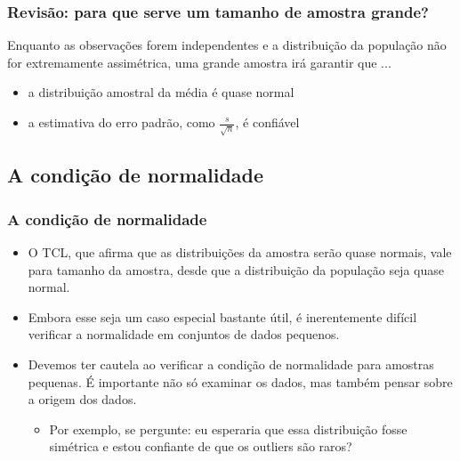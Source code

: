 \begin{frame}
\frametitle{Revisão: para que serve um tamanho de amostra grande?}
\justifying
Enquanto as observações forem independentes e a distribuição da população não for extremamente assimétrica, uma grande amostra irá garantir que ...

\begin{itemize}
\justifying
\item a distribuição amostral da média é quase normal
\justifying
\item a estimativa do erro padrão, como $\frac{s}{\sqrt{n}}$, é confiável

\end{itemize}

\end{frame}


\subsection{A condição de normalidade}


\begin{frame}
\frametitle{A condição de normalidade}

\begin{itemize}
\justifying
\item O TCL, que afirma que as distribuições da amostra serão quase normais, vale para  tamanho da amostra, desde que a distribuição da população seja quase normal.

\pause
\justifying
\item Embora esse seja um caso especial bastante útil, é inerentemente difícil verificar a normalidade em conjuntos de dados pequenos.

\pause
\justifying
\item Devemos ter cautela ao verificar a condição de normalidade para amostras pequenas. É importante não só examinar os dados, mas também pensar sobre a origem dos dados.
\begin{itemize}
\justifying
\item Por exemplo, se pergunte: eu esperaria que essa distribuição fosse simétrica e estou confiante de que os outliers são raros?
\end{itemize}

\end{itemize}

\end{frame}

